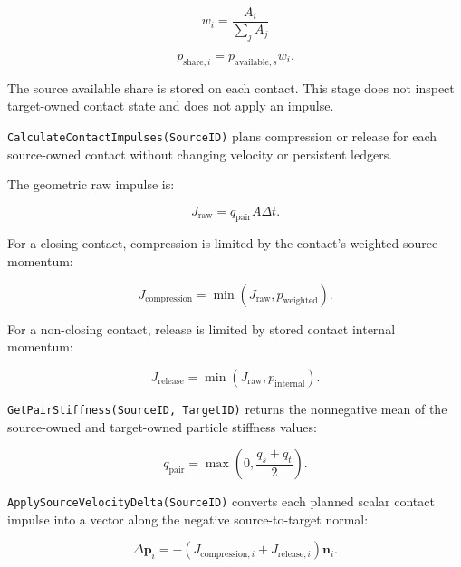 \begin{equation}
w_i = \frac{A_i}{\sum_j A_j}
\end{equation}

\begin{equation}
p_{\mathrm{share},i} = p_{\mathrm{available},s} w_i.
\end{equation}

The source available share is stored on each contact.  This stage does not
inspect target-owned contact state and does not apply an impulse.


\texttt{CalculateContactImpulses(SourceID)} plans compression or release for
each source-owned contact without changing velocity or persistent ledgers.

The geometric raw impulse is:

\begin{equation}
J_{\mathrm{raw}} = q_{\mathrm{pair}} A \Delta t.
\end{equation}

For a closing contact, compression is limited by the contact's weighted source
momentum:

\begin{equation}
J_{\mathrm{compression}}
=
\min(J_{\mathrm{raw}},p_{\mathrm{weighted}}).
\end{equation}

For a non-closing contact, release is limited by stored contact internal
momentum:

\begin{equation}
J_{\mathrm{release}}
=
\min(J_{\mathrm{raw}},p_{\mathrm{internal}}).
\end{equation}


\texttt{GetPairStiffness(SourceID, TargetID)} returns the nonnegative mean of
the source-owned and target-owned particle stiffness values:

\begin{equation}
q_{\mathrm{pair}} = \max\left(0,\frac{q_s+q_t}{2}\right).
\end{equation}


\texttt{ApplySourceVelocityDelta(SourceID)} converts each planned scalar
contact impulse into a vector along the negative source-to-target normal:

\begin{equation}
\Delta\mathbf{p}_i
=
-(J_{\mathrm{compression},i}+J_{\mathrm{release},i})\mathbf{n}_i.
\end{equation}

